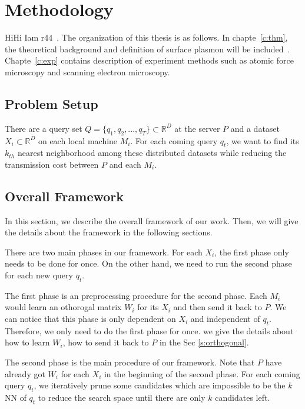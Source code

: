 \chapter{Methodology}
\label{c:method}

HiHi Iam r44~. The organization of this thesis is as follows. In chapte~\ref{c:thm}, the theoretical background and definition of surface plasmon will be included~\cite{maier2007plasmonics}. Chapte~\ref{c:exp} contains description of experiment methods such as atomic force microscopy and scanning electron microscopy. 

\section{Problem Setup}
\label{s:probsetup}
There are a query set $Q={\{q_1,q_2,...,q_T\}}\subset\mathbb{R}^D$ at the server $P$ and a dataset $X_i\subset\mathbb{R}^D$ on each local machine $M_i$.  For each coming query $q_t$, we want to find its $k_{th}$ nearest neighborhood among these distributed datasets while reducing the transmission cost between $P$ and each $M_i$.

\section{Overall Framework}
\label{s:overall}
In this section, we describe the overall framework of our work.  Then, we will give the details about the framework in the following sections.

There are two main phases in our framework.  For each $X_i$, the first phase only needs to be done for once.  On the other hand, we need to run the second phase for each new query $q_t$.

The first phase is an preprocessing procedure for the second phase. Each $M_i$ would learn an othorogal matrix $W_i$ for its $X_i$ and then send it back to $P$.  We can notice that this phase is only dependent on $X_i$ and independent of $q_t$.  Therefore, we only need to do the first phase for once.  we give the details about how to learn $W_i$, how to send it back to $P$ in the Sec \ref{s:orthogonal}.

The second phase is the main procedure of our framework.  Note that $P$ have already got $W_i$ for each $X_i$ in the beginning of the second phase. For each coming query $q_t$, we iteratively prune some candidates which are impossible to be the $k$NN of $q_t$ to reduce the search space until there are only $k$ candidates left.

